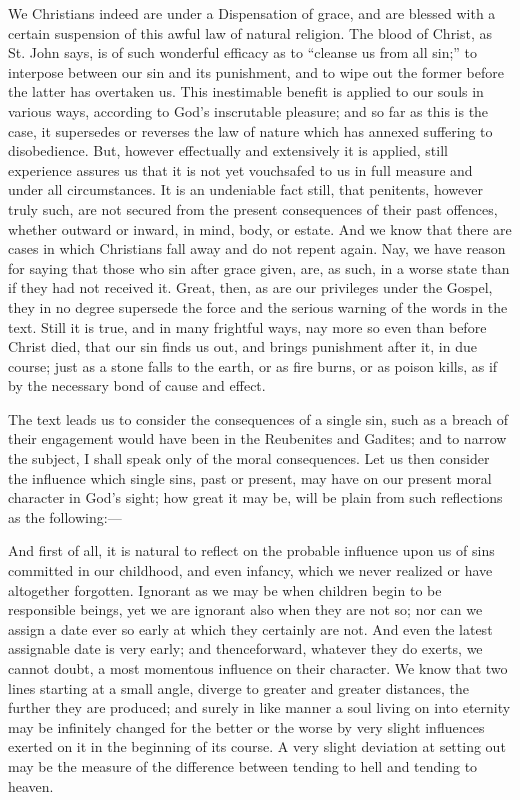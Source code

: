 We Christians indeed are under a Dispensation of grace, and are
blessed with a certain suspension of this awful law of natural
religion. The blood of Christ, as St. John says, is of such wonderful
efficacy as to ``cleanse us from all sin;'' to interpose
between our sin and its punishment, and to wipe out the former before
the latter has overtaken us. This inestimable benefit is applied to
our souls in various ways, according to God's inscrutable pleasure;
and so far as this is the case, it supersedes or reverses the law of
nature which has annexed suffering to disobedience. But, however
effectually and extensively it is applied, still experience assures us
that it is not yet vouchsafed to us in full measure and under all
circumstances. It is an undeniable fact still, that penitents, however
truly such, are not secured from the present consequences of their
past offences, whether outward or inward, in mind, body, or estate.
And we know that there are cases in which Christians fall away and do
not repent again. Nay, we have reason for saying that those who sin
after grace given, are, as such, in a worse state than if they had not
received it. Great, then, as are our privileges under the Gospel, they
in no degree supersede the force and the serious warning of the words
in the text. Still it is true, and in many frightful ways, nay more so
even than before Christ died, that our sin finds us out, and brings
punishment after it, in due course; just as a stone falls to the
earth, or as fire burns, or as poison kills, as if by the necessary
bond of cause and effect.

The text leads us to consider the consequences of a single sin,
such as a breach of their engagement would have been in the Reubenites
and Gadites; and to narrow the subject, I shall speak only of the
moral consequences. Let us then consider the influence which single
sins, past or present, may have on our present moral character in
God's sight; how great it may be, will be plain from such reflections
as the following:—

And first of all, it is natural to reflect on the probable
influence upon us of sins committed in our childhood, and even
infancy, which we never realized or have altogether forgotten.
Ignorant as we may be when children begin to be responsible beings,
yet we are ignorant also when they are not so; nor can we assign a
date ever so early at which they certainly are not. And even the
latest assignable date is very early; and thenceforward, whatever they
do exerts, we cannot doubt, a most momentous influence on their
character. We know that two lines starting at a small angle, diverge
to greater and greater distances, the further they are produced; and
surely in like manner a soul living on into eternity may be infinitely
changed for the better or the worse by very slight influences exerted
on it in the beginning of its course. A very slight deviation at
setting out may be the measure of the difference between tending to
hell and tending to heaven.

